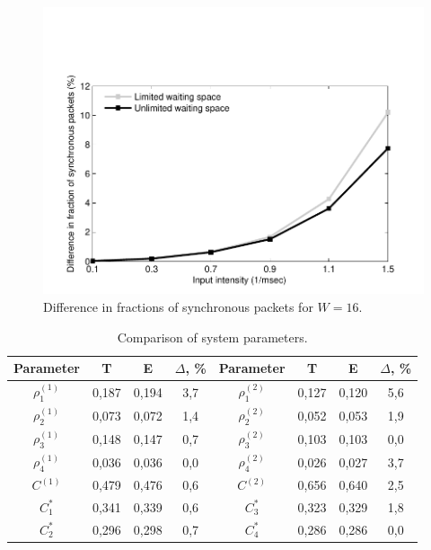 \documentclass[10pt]{article}
\begin{document}
\begin{figure}[h!]
   \centering
    \includegraphics[width=\textwidth]{1.pdf} %
    \caption {Difference in fractions of synchronous packets for $W=16$.}
    \label{pic1}
\end{figure}

\begin{table}[h!]\begin{center}
\label{tab}
\begin{tabular}{|c||c|c|c||c||c|c|c|}\hline
  Parameter & T & E & $\Delta$, \% & Parameter & T & E & $\Delta$, \% \\ \hline \hline
  $\rho_{1}^{(1)}$ & 0,187 & 0,194 & 3,7 &  $\rho_{1}^{(2)}$ & 0,127 & 0,120 & 5,6 \\ \hline
  $\rho_{2}^{(1)}$ & 0,073 & 0,072 & 1,4 &  $\rho_{2}^{(2)}$ & 0,052 & 0,053 & 1,9 \\ \hline
  $\rho_{3}^{(1)}$ & 0,148 & 0,147 & 0,7 &  $\rho_{3}^{(2)}$ & 0,103 & 0,103 & 0,0 \\ \hline
  $\rho_{4}^{(1)}$ & 0,036 & 0,036 & 0,0 &  $\rho_{4}^{(2)}$ & 0,026 & 0,027 & 3,7 \\ \hline \hline
  $C^{(1)}$ & 0,479 & 0,476 & 0,6 & $C^{(2)}$ & 0,656 & 0,640 & 2,5 \\ \hline \hline
  $C_{1}^{*}$ & 0,341 & 0,339 & 0,6 & $C_{3}^{*}$ & 0,323 & 0,329 & 1,8 \\ \hline
  $C_{2}^{*}$ & 0,296 & 0,298 & 0,7 & $C_{4}^{*}$ & 0,286 & 0,286 & 0,0 \\ \hline
\end{tabular}\caption{Comparison of system parameters.}
\end{center}\end{table}
\end{document}
